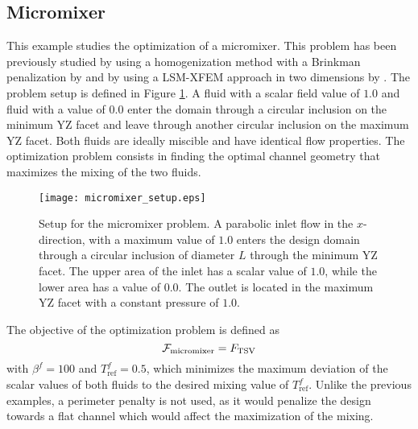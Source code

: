 \subsection{Micromixer}
\label{sec:micromixer}
This example studies the optimization of a micromixer. This problem has been previously studied by using a homogenization method with a Brinkman penalization by \citep{MPY+:12} and by using a LSM-XFEM approach in two dimensions by \citep{MM:14}. The problem setup is defined in Figure \ref{fig:micromixer_setup}. A fluid with a scalar field value of $1.0$ and fluid with a value of $0.0$ enter the domain through a circular inclusion on the minimum YZ facet and leave through another circular inclusion on the maximum YZ facet. Both fluids are ideally miscible and have identical flow properties. The optimization problem consists in finding the optimal channel geometry that maximizes the mixing of the two fluids.
%
\begin{figure}
	\centering
	\texttt{[image: micromixer\_setup.eps]}
	\caption{Setup for the micromixer problem. A parabolic inlet flow in the $x$-direction, with a maximum value of $1.0$ enters the design domain through a circular inclusion of diameter $L$ through the minimum YZ facet. The upper area of the inlet has a scalar value of $1.0$, while the lower area has a value of $0.0$. The outlet is located in the maximum YZ facet with a constant pressure of $1.0$.}
	\label{fig:micromixer_setup}
\end{figure}
%
The objective of the optimization problem is defined as
%
\begin{equation}
	\centering
	\label{eq:micromixer_objective}
	\mathcal{F}_{\mathrm{micromixer}} = F_{\mathrm{TSV}}
\end{equation}
%
with $\beta^{f} = 100$ and $T_{\mathrm{ref}}^{f} = 0.5$, which minimizes the maximum deviation of the scalar values of both fluids to the desired mixing value of $T_{\mathrm{ref}}^{f}$. Unlike the previous examples, a perimeter penalty is not used, as it would penalize the design towards a flat channel which would affect the maximization of the mixing.


